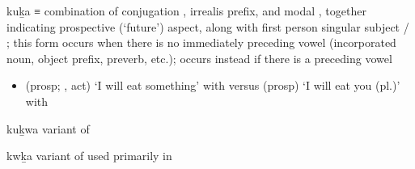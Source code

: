 \begin{morphdesc}[resume*=alphalist]
\item[kuḵa]
	≡ 
	combination of conjugation ,
		irrealis  prefix,
		and modal ,
			together indicating prospective (‘future’) aspect,
		along with first person singular subject  / ;
	this form occurs when there is no
		immediately preceding vowel (incorporated noun, object prefix, preverb, etc.);
	 occurs instead if there is a preceding vowel
	\begin{itemize}
	\item	{} (prosp; ,  act) ‘I will eat something’
			with \newline
		versus  (prosp) ‘I will eat you (pl.)’
			with 
	\end{itemize}

\item[kuḵwa]
	variant of 
	
\item[kwḵa]
	variant of  used primarily in \cite{story-naish:1973}
\end{morphdesc}

